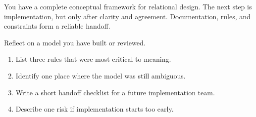 \begin{chaptersummary}
You have a complete conceptual framework for relational design.
The next step is implementation, but only after clarity and agreement.
Documentation, rules, and constraints form a reliable handoff.
\end{chaptersummary}

\begin{exercisebox}
Reflect on a model you have built or reviewed.
\begin{enumerate}[label=\arabic*.]
  \item List three rules that were most critical to meaning.
  \item Identify one place where the model was still ambiguous.
  \item Write a short handoff checklist for a future implementation team.
  \item Describe one risk if implementation starts too early.
\end{enumerate}
\end{exercisebox}

